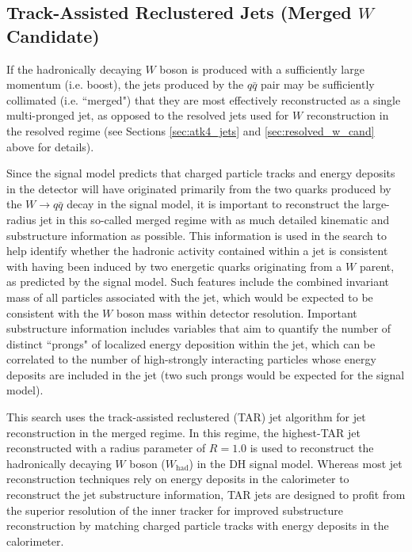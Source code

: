 \subsection{Track-Assisted Reclustered Jets (Merged \(W\) Candidate)}
\label{sec:TAR_jets}

If the hadronically decaying \(W\) boson is produced with a sufficiently large momentum (i.e. boost), the jets produced by the \(q\bar{q}\) pair may be sufficiently collimated (i.e. ``merged") that they are most effectively reconstructed as a single multi-pronged \largeR jet, as opposed to the resolved \smallR jets used for \(W\) reconstruction in the resolved regime (see Sections \ref{sec:atk4_jets} and \ref{sec:resolved_w_cand} above for details). 

Since the signal model predicts that charged particle tracks and energy deposits in the detector will have originated primarily from the two quarks produced by the \(W\rightarrow q\bar{q}\) decay in the signal model, it is important to reconstruct the large-radius jet in this so-called merged regime with as much detailed kinematic and substructure information as possible. This information is used in the search to help identify whether the hadronic activity contained within a \largeR jet is consistent with having been induced by two energetic quarks originating from a \(W\) parent, as predicted by the signal model. Such features include the combined invariant mass \mTAR of all particles associated with the jet, which would be expected to be consistent with the \(W\) boson mass within detector resolution. Important substructure information includes variables that aim to quantify the number of distinct ``prongs" of localized energy deposition within the jet, which can be correlated to the number of high-\pt strongly interacting particles whose energy deposits are included in the jet (two such prongs would be expected for the signal model). 

This search uses the track-assisted reclustered (TAR) jet algorithm \cite{ATL-PHYS-PUB-2018-012} for \largeR jet reconstruction in the merged regime. In this regime, the highest-\pt TAR jet reconstructed with a radius parameter of \(R=1.0\) is used to reconstruct the hadronically decaying \(W\) boson (\(W_\text{had}\)) in the DH signal model. Whereas most \largeR jet reconstruction techniques rely on energy deposits in the calorimeter to reconstruct the jet substructure information, TAR jets are designed to profit from the superior resolution of the inner tracker for improved substructure reconstruction by matching charged particle tracks with energy deposits in the calorimeter. 

